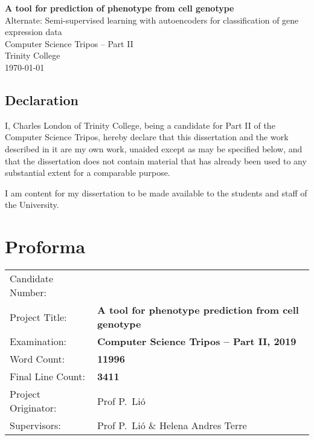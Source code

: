 \documentclass[12pt,a4paper,twoside,openany]{report}
\begin{document}

\pagestyle{empty}


\vspace*{60mm}
\begin{center}
\Huge
\textbf{A tool for prediction of phenotype from cell genotype} \\[5mm]
{\Large Alternate: Semi-supervised learning with autoencoders for classification of gene expression data} \\[5mm]
Computer Science Tripos -- Part II \\[5mm]
Trinity College \\[5mm]
\today  %
\end{center}


\pagestyle{plain}
 
\newpage
\section*{Declaration}

I, Charles London of Trinity College, being a candidate for Part II of the Computer
Science Tripos, hereby declare
that this dissertation and the work described in it are my own work,
unaided except as may be specified below, and that the dissertation
does not contain material that has already been used to any substantial
extent for a comparable purpose. 

I am content for my dissertation to be made available to the students and staff of the University.

\bigskip
{}

\medskip
{}

\chapter*{Proforma}

{\large
\begin{tabular}{ll}
Candidate Number:   & \bf                    \\
Project Title:      & \bf A tool for phenotype prediction from cell genotype  \\
Examination:        & \bf Computer Science Tripos -- Part II, 2019  \\
Word Count:         & \bf 11996\footnotemark[1]  \\
Final Line Count:   & \bf 3411\\
Project Originator: & Prof P.~Li\'o                   \\
Supervisors:         & Prof P.~Li\'o \& Helena Andres Terre                   \\ 
\end{tabular}
}
\end{document}
